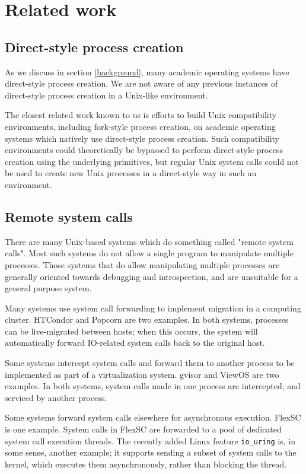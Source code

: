 \documentclass[letterpaper,twocolumn,10pt]{article}
\begin{document}
\section{Related work}\label{related_work}
\subsection{Direct-style process creation}
As we discuss in section \ref{background},
many academic operating systems have direct-style process creation.
We are not aware of any previous instances of direct-style process creation in a Unix-like environment.

The closest related work known to us
is efforts to build Unix compatibility environments, including fork-style process creation,
on academic operating systems which natively use direct-style process creation.\cite{exokernel}
Such compatibility environments could theoretically be bypassed to perform direct-style process creation
using the underlying primitives,
but regular Unix system calls could not be used to create new Unix processes in a direct-style way
in such an environment.
\subsection{Remote system calls}
There are many Unix-based systems which do something called "remote system calls".
Most such systems do not allow a single program to manipulate multiple processes.
Those systems that do allow manipulating multiple processes
are generally oriented towards debugging and introspection,
and are unsuitable for a general purpose system.

Many systems use system call forwarding to implement migration in a computing cluster.
HTCondor\cite{condor} and Popcorn\cite{popcorn} are two examples.
In both systems, processes can be live-migrated between hosts;
when this occurs, the system will automatically forward IO-related system calls
back to the original host.

Some systems intercept system calls and forward them to another process to be implemented
as part of a virtualization system.
gvisor\cite{gvisor} and ViewOS\cite{viewos} are two examples.
In both systems,
system calls made in one process are intercepted,
and serviced by another process.

Some systems forward system calls elsewhere for asynchronous execution.
FlexSC\cite{flexsc} is one example.
System calls in FlexSC are forwarded to a pool of dedicated system call execution threads.
The recently added Linux feature \verb|io_uring| is, in some sense, another example;
it supports sending a subset of system calls to the kernel,
which executes them asynchronously,
rather than blocking the thread.
\end{document}
